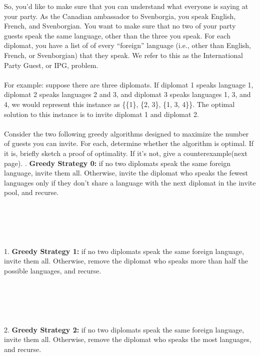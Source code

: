 \documentclass[12pt]{article}
\begin{document}
So, you’d like to make sure that you can understand
what everyone is saying at your party. As the Canadian 
ambassador to Svenborgia, you speak English,
French, and Svenborgian. You want to make sure 
that no two of your party guests speak the same language,
other than the three you speak. For each diplomat, 
you have a list of of every “foreign” language (i.e.,
other than English, French, or Svenborgian) that they 
speak. We refer to this as the International Party
Guest, or IPG, problem.\\\\
For example: suppose there 
are three diplomats. If 
diplomat 1 speaks language 
1, diplomat 2 speaks
languages 2 and 3, and diplomat 
3 speaks languages 1, 3, and 4, we 
would represent this instance as
\{\{1\}, \{2, 3\}, \{1, 3, 4\}\}. 
The optimal solution to this instance 
is to invite diplomat 1 and diplomat 2.\\\\
Consider the two following greedy algorithms 
designed to maximize the number of guests you 
can invite. For each, determine whether the 
algorithm is optimal. If it is, briefly sketch a 
proof of optimality. If
it’s not, give a counterexample(next page).
\newpage
{}. \textbf{Greedy Strategy 0:} if no two diplomats 
speak the same foreign language, invite them all. 
Otherwise, invite the diplomat who speaks the fewest 
languages only if they don't share a language with
the next diplomat in the invite pool, and recurse.\\\\\\\\\\\\
1. \textbf{Greedy Strategy 1:} if no two diplomats 
speak the same foreign language, invite them all. 
Otherwise, remove the diplomat who speaks 
more than half the possible languages, and recurse.\\\\\\\\\\\\
2. \textbf{Greedy Strategy 2:} if no two diplomats 
speak the same foreign language, invite them all. Otherwise,
remove the diplomat who speaks the most languages, and recurse.\\\\\\\\\\\\
\end{document}
